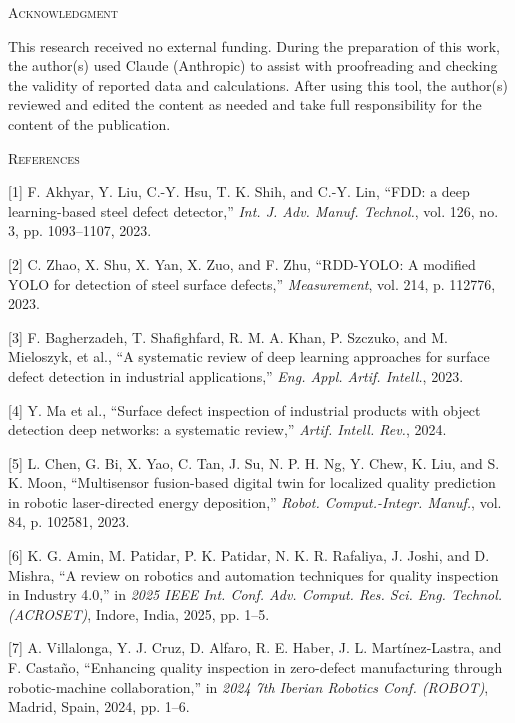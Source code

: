 \documentclass[conference]{IEEEtran}
\begin{document}
\begin{center}\textsc{Acknowledgment}\end{center}
This research received no external funding. During the preparation of this work, the author(s) used Claude (Anthropic) to assist with proofreading and checking the validity of reported data and calculations. After using this tool, the author(s) reviewed and edited the content as needed and take full responsibility for the content of the publication.

\begin{center}\textsc{References}\end{center}

{[}1{]} F. Akhyar, Y. Liu, C.-Y. Hsu, T. K. Shih, and C.-Y. Lin, ``FDD: a deep learning-based steel defect detector,'' \textit{Int. J. Adv. Manuf. Technol.}, vol. 126, no. 3, pp. 1093--1107, 2023.

{[}2{]} C. Zhao, X. Shu, X. Yan, X. Zuo, and F. Zhu, ``RDD-YOLO: A modified YOLO for detection of steel surface defects,'' \textit{Measurement}, vol. 214, p. 112776, 2023.

{[}3{]} F. Bagherzadeh, T. Shafighfard, R. M. A. Khan, P. Szczuko, and M. Mieloszyk, et al., ``A systematic review of deep learning approaches for surface defect detection in industrial applications,'' \textit{Eng. Appl. Artif. Intell.}, 2023.

{[}4{]} Y. Ma et al., ``Surface defect inspection of industrial products with object detection deep networks: a systematic review,'' \textit{Artif. Intell. Rev.}, 2024.

{[}5{]} L. Chen, G. Bi, X. Yao, C. Tan, J. Su, N. P. H. Ng, Y. Chew, K. Liu, and S. K. Moon, ``Multisensor fusion-based digital twin for localized quality prediction in robotic laser-directed energy deposition,'' \textit{Robot. Comput.-Integr. Manuf.}, vol. 84, p. 102581, 2023.

{[}6{]} K. G. Amin, M. Patidar, P. K. Patidar, N. K. R. Rafaliya, J. Joshi, and D. Mishra, ``A review on robotics and automation techniques for quality inspection in Industry 4.0,'' in \textit{2025 IEEE Int. Conf. Adv. Comput. Res. Sci. Eng. Technol. (ACROSET)}, Indore, India, 2025, pp. 1--5.

{[}7{]} A. Villalonga, Y. J. Cruz, D. Alfaro, R. E. Haber, J. L. Mart\'inez-Lastra, and F. Casta\~no, ``Enhancing quality inspection in zero-defect manufacturing through robotic-machine collaboration,'' in \textit{2024 7th Iberian Robotics Conf. (ROBOT)}, Madrid, Spain, 2024, pp. 1--6.
\end{document}
